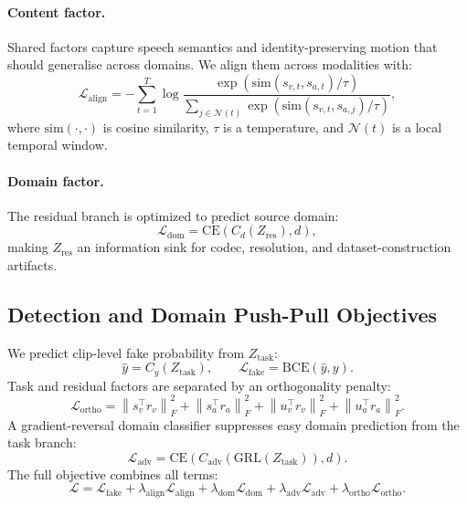 \documentclass{article}
\begin{document}
\paragraph{Content factor.}
Shared factors capture speech semantics and identity-preserving motion that should generalise across domains. We align them across modalities with:
\begin{equation}
\mathcal{L}_{\mathrm{align}} = - \sum_{t=1}^T
\log
\frac{\exp(\mathrm{sim}(s_{v,t}, s_{a,t})/\tau)}
{\sum_{j \in \mathcal{N}(t)} \exp(\mathrm{sim}(s_{v,t}, s_{a,j})/\tau)},
\end{equation}
where $\mathrm{sim}(\cdot,\cdot)$ is cosine similarity, $\tau$ is a temperature, and $\mathcal{N}(t)$ is a local temporal window.

\paragraph{Domain factor.}
The residual branch is optimized to predict source domain:
\begin{equation}
\mathcal{L}_{\mathrm{dom}} = \mathrm{CE}(C_d(Z_{\mathrm{res}}), d),
\end{equation}
making $Z_{\mathrm{res}}$ an information sink for codec, resolution, and dataset-construction artifacts.

\subsection{Detection and Domain Push-Pull Objectives}

We predict clip-level fake probability from $Z_{\mathrm{task}}$:
\begin{equation}
\hat{y} = C_y(Z_{\mathrm{task}}), \qquad \mathcal{L}_{\mathrm{fake}} = \mathrm{BCE}(\hat{y}, y).
\end{equation}
Task and residual factors are separated by an orthogonality penalty:
\begin{equation}
\mathcal{L}_{\mathrm{ortho}} =
\left\| s_v^\top r_v \right\|_F^2
+ \left\| s_a^\top r_a \right\|_F^2
+ \left\| u_v^\top r_v \right\|_F^2
+ \left\| u_a^\top r_a \right\|_F^2.
\end{equation}
A gradient-reversal domain classifier suppresses easy domain prediction from the task branch:
\begin{equation}
\mathcal{L}_{\mathrm{adv}} =
\mathrm{CE}(C_{\mathrm{adv}}(\mathrm{GRL}(Z_{\mathrm{task}})), d).
\end{equation}
The full objective combines all terms:
\begin{equation}
\mathcal{L}
=
\mathcal{L}_{\mathrm{fake}}
+
\lambda_{\mathrm{align}} \mathcal{L}_{\mathrm{align}}
+
\lambda_{\mathrm{dom}} \mathcal{L}_{\mathrm{dom}}
+
\lambda_{\mathrm{adv}} \mathcal{L}_{\mathrm{adv}}
+
\lambda_{\mathrm{ortho}} \mathcal{L}_{\mathrm{ortho}}.
\end{equation}
\end{document}
